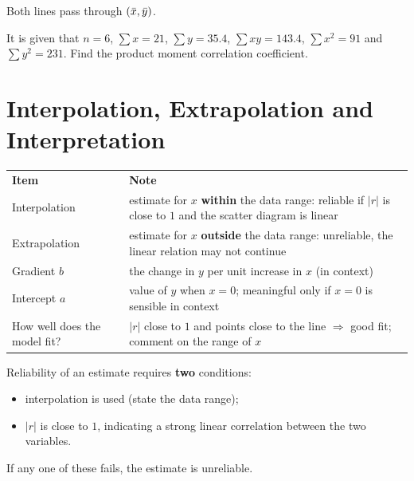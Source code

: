 \begin{info}[title=Note]
Both lines pass through $(\bar{x},\bar{y})$.
\end{info}
\noindent\exlab It is given that $n=6$, $\sum x=21$, $\sum y=35.4$, $\sum xy=143.4$, $\sum x^{2}=91$ and $\sum y^{2}=231$. Find the product moment correlation coefficient.
\section{Interpolation, Extrapolation and Interpretation}
\begin{center}\ba\small
\begin{tabular}{|L{4.0cm}|L{11.2cm}|}\hline
\textbf{Item} & \textbf{Note}\\\Xhline{2pt}
Interpolation & estimate for $x$ \textbf{within} the data range: reliable if $|r|$ is close to $1$ and the scatter diagram is linear\\\hline
Extrapolation & estimate for $x$ \textbf{outside} the data range: unreliable, the linear relation may not continue\\\hline
Gradient $b$ & the change in $y$ per unit increase in $x$ (in context)\\\hline
Intercept $a$ & value of $y$ when $x=0$; meaningful only if $x=0$ is sensible in context\\\hline
How well does the model fit? & $|r|$ close to $1$ and points close to the line $\Rightarrow$ good fit; comment on the range of $x$\\\hline
\end{tabular}\end{center}
\begin{info}[title=Note]
Reliability of an estimate requires \textbf{two} conditions:
\begin{itemize}[leftmargin=1.4em,itemsep=0pt,topsep=2pt]
\item interpolation is used (state the data range);
\item $|r|$ is close to $1$, indicating a strong linear correlation between the two variables.
\end{itemize}
If any one of these fails, the estimate is unreliable.
\end{info}
